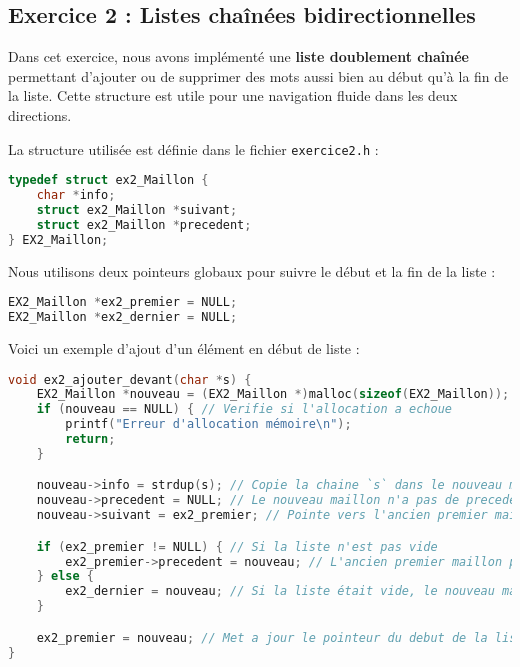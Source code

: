 \documentclass[a4paper,12pt]{article}
\begin{document}
\subsection{Exercice 2 : Listes chaînées bidirectionnelles}

Dans cet exercice, nous avons implémenté une \textbf{liste doublement chaînée} permettant d'ajouter ou de supprimer des mots aussi bien au début qu'à la fin de la liste. Cette structure est utile pour une navigation fluide dans les deux directions.

La structure utilisée est définie dans le fichier \texttt{exercice2.h} :

\begin{lstlisting}[language=C, caption={Structure d'un maillon de liste doublement chaînée}]
typedef struct ex2_Maillon {
    char *info;
    struct ex2_Maillon *suivant;
    struct ex2_Maillon *precedent;
} EX2_Maillon;
\end{lstlisting}

Nous utilisons deux pointeurs globaux pour suivre le début et la fin de la liste :

\begin{lstlisting}[language=C, caption={Pointeurs globaux pour début et fin de liste}]
EX2_Maillon *ex2_premier = NULL;
EX2_Maillon *ex2_dernier = NULL;
\end{lstlisting}

Voici un exemple d'ajout d'un élément en début de liste :

\begin{lstlisting}[language=C, caption={Ajout d'un mot en tête de la liste}]
void ex2_ajouter_devant(char *s) {
    EX2_Maillon *nouveau = (EX2_Maillon *)malloc(sizeof(EX2_Maillon)); // Alloue un nouveau maillon
    if (nouveau == NULL) { // Verifie si l'allocation a echoue
        printf("Erreur d'allocation mémoire\n");
        return;
    }

    nouveau->info = strdup(s); // Copie la chaine `s` dans le nouveau maillon
    nouveau->precedent = NULL; // Le nouveau maillon n'a pas de precedent
    nouveau->suivant = ex2_premier; // Pointe vers l'ancien premier maillon

    if (ex2_premier != NULL) { // Si la liste n'est pas vide
        ex2_premier->precedent = nouveau; // L'ancien premier maillon pointe vers le nouveau
    } else {
        ex2_dernier = nouveau; // Si la liste était vide, le nouveau maillon devient aussi le dernier
    }

    ex2_premier = nouveau; // Met a jour le pointeur du debut de la liste
}

\end{lstlisting}
\end{document}

